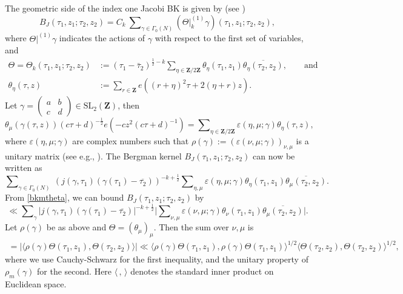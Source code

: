 \documentclass[11pt]{amsart}
\numberwithin{equation}{section}
\theoremstyle{plain}
\theoremstyle{definition}
\newcommand{\mf}{\mathbf}
\newcommand{\mrm}{\mathrm}
\newcommand{\lan}{\langle }
\newcommand{\ran}{\rangle}
\newcommand{\q}{\quad}
\newcommand{\sumn}{\sum \nolimits}
\newcommand{\smat}[4]{\left( \begin{smallmatrix}#1&#2\\#3&#4\end{smallmatrix}\right)}
\newcommand{\sltwo}{\mrm{SL}_2(\mf Z)}
\begin{document}
The geometric side of the index one Jacobi BK is given by (see \cite[pp. 184]{sko-zag})
\begin{equation}\label{BKGeometric}
    B_{J}(\tau_1,z_1;\tau_2,z_2)= C_k\ \sumn_{\gamma\in\Gamma_0(N)}(\Theta|^{(1)}_{k}\gamma)(\tau_1,z_1;\tau_2,z_2),
\end{equation}
where $\Theta |^{(1)} \gamma$ indicates the actions of $\gamma$ with respect to the first set of variables, and
\begin{align} \label{theta-def}
    \Theta=\Theta_{k}(\tau_1,z_1;\tau_2,z_2) &:=(\tau_1-\bar{\tau}_2)^{\frac{1}{2}-k}\sumn_{\eta\in \mf Z/2\mf Z}\theta_{\eta}(\tau_1,z_1)\overline{\theta_{\eta}(\tau_2,z_2)}, \q \q \text{and}  \\
\theta_{\eta}(\tau,z)& :=\sumn_{r\in \mf Z}e( (r+\eta)^2\tau+2(\eta+r)z).
\end{align}
Let $\gamma=\smat{a}{b}{c}{d}\in \sltwo$, then
\begin{equation}\label{thetatrans}
\theta_{\mu}\left(\gamma(\tau,z)\right)(c \tau + d)^{-\frac{1}{2}} e\left(-c z^2 (c \tau+d)^{-1}\right)=\sumn_{\eta\in\mf Z/2\mf Z} \varepsilon(\eta, \mu;\gamma)\theta_{\eta}(\tau, z),
\end{equation}
where $\varepsilon(\eta, \mu;\gamma)$ are complex numbers such that $\rho(\gamma):=\left(\varepsilon(\nu, \mu;\gamma)\right)_{\nu,\mu}$ is a unitary matrix (see e.g., \cite{arakawa1992selberg}). The Bergman kernel  $B_{J}(\tau_1,z_1;\tau_2,z_2)$ can now be written as
\begin{equation}\label{bkmtheta}
\sumn_{\gamma\in\Gamma_0(N)}\  \left(j(\gamma,\tau_1)(\gamma(\tau_1)-\overline{\tau_2})\right)^{-k+\frac{1}{2}}\sumn_{\eta,\mu}\varepsilon(\eta, \mu;\gamma)\theta_{\eta}(\tau_1, z_1)\overline{\theta_{\mu}(\tau_2,z_2)}.
\end{equation}
From \eqref{bkmtheta}, we can bound $B_{J}(\tau_1,z_1;\tau_2,z_2)$ by
\begin{equation}\label{BKbydef}
    \ll  \sumn_{\gamma}\left|j(\gamma,\tau_1)(\gamma(\tau_1)-\overline{\tau_2})\right|^{-k+\frac{1}{2}}\big|\sumn_{\nu,\mu}\varepsilon(\nu, \mu;\gamma)\theta_{\nu}(\tau_1, z_1)\overline{\theta_{\mu}(\tau_2,z_2)}\big|.
\end{equation}
Let $\rho(\gamma)$ be as above and $\Theta=(\theta_{\mu})_{\mu}$. Then the sum over $\nu,\mu$ is 
\begin{align}
    =\left|\lan \rho(\gamma)\Theta(\tau_1,z_1),\Theta(\tau_2,z_2)\ran \right|{\ll}\lan \rho(\gamma)\Theta(\tau_1,z_1),\rho(\gamma)\Theta(\tau_1,z_1)\ran^{1/2}\lan \Theta(\tau_2,z_2),\Theta(\tau_2,z_2)\ran^{1/2} ,%
\end{align}
where we use Cauchy-Schwarz for the first inequality, and the unitary property of $\rho_m(\gamma)$ for the second. Here $\lan \, , \, \ran$ denotes the standard inner product on Euclidean space.
\end{document}
